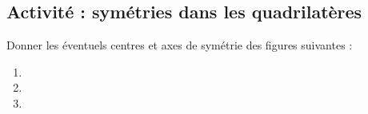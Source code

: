 

\subsection*{Activité : symétries dans les quadrilatères}

Donner les éventuels centres et axes de symétrie des figures suivantes :
\begin{multicols}{2}
\begin{enumerate}
    \item

    \item

    \item

\end{enumerate}
\end{multicols}


